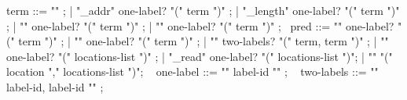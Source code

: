 \begin{syntax}
  term ::= "\null" ;
        | "\base_addr" { one-label? } "(" term ")" ;
        | "\block_length" { one-label? } "(" term ")" ;
        | "\offset" { one-label? } "(" term ")" ;
        | { "\allocation" one-label? "(" term ")" };
       \
  pred ::= { "\allocable" one-label? "(" term ")" };
       | "\freeable" { one-label? } "(" term ")" ;
       | { "\fresh" two-labels? "(" term, term ")" };
       | "\valid" { one-label? } "(" locations-list ")" ;
       | "\valid_read" { one-label? } "(" locations-list ")";
       | "\separated" "(" location "," locations-list ")";
       \
  { one-label } ::= { "{" label-id "}" } ;
       \
  { two-labels } ::= { "{" label-id, label-id "}" } ;
\end{syntax}

